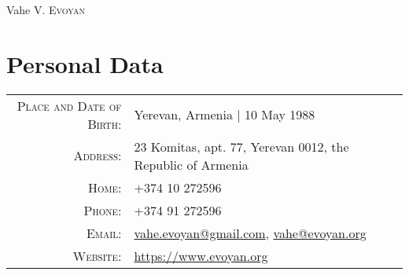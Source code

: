 \documentclass[a4paper,10pt]{article}
\begin{document}
\pagestyle{empty} %

\par{\centering
    {\Huge Vahe V. \textsc{Evoyan}
  }\bigskip\par}

\section{Personal Data}
\begin{tabular}{rl}
    \textsc{Place and Date of Birth:} & Yerevan, Armenia | 10 May 1988 \\
    \textsc{Address:}                 & 23 Komitas, apt. 77, Yerevan 0012, the
                                        Republic of Armenia \\
    \textsc{Home:}                    & +374 10 272596\\
    \textsc{Phone:}                   & +374 91 272596\\
    \textsc{Email:}                   & \href{mailto:vahe.evoyan@gmail.com}
                                             {vahe.evoyan@gmail.com},
                                        \href{mailto:vahe@evoyan.org}
                                             {vahe@evoyan.org}\\
    \textsc{Website:}                 & \href{https://www.evoyan.org}
                                             {https://www.evoyan.org}
\end{tabular}


\end{document}
